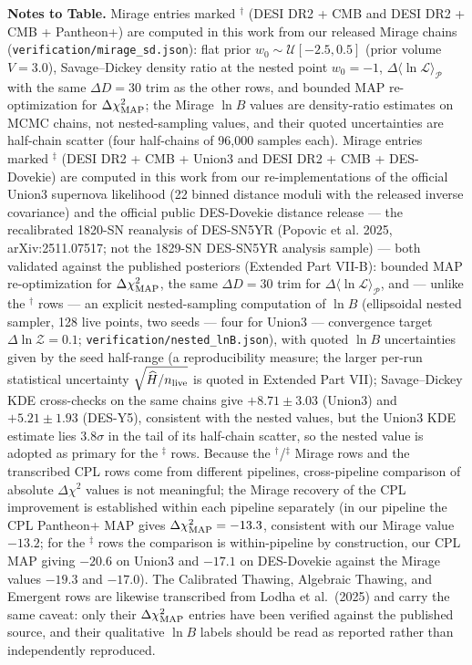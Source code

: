 \documentclass[aps,prd,preprint,superscriptaddress,nofootinbib]{revtex4-2}
\begin{document}
\begin{table}[!htbp]
\par\vspace{4pt}\noindent\textbf{Notes to Table.} Mirage entries marked $^{\dagger}$ (DESI DR2 + CMB and DESI DR2 + CMB + Pantheon+) are computed in this work from our released Mirage chains (\texttt{verification/mirage\_sd.json}): flat prior $w_0 \sim \mathcal{U}[-2.5, 0.5]$ (prior volume $V = 3.0$), Savage--Dickey density ratio at the nested point $w_0 = -1$, $\Delta\langle\ln\mathcal{L}\rangle_{\mathcal{P}}$ with the same $\Delta D = 30$ trim as the other rows, and bounded MAP re-optimization for $\Delta\chi^2_{\rm MAP}$; the Mirage $\ln B$ values are density-ratio estimates on MCMC chains, not nested-sampling values, and their quoted uncertainties are half-chain scatter (four half-chains of 96{,}000 samples each). Mirage entries marked $^{\ddagger}$ (DESI DR2 + CMB + Union3 and DESI DR2 + CMB + DES-Dovekie) are computed in this work from our re-implementations of the official Union3 supernova likelihood (22 binned distance moduli with the released inverse covariance) and the official public DES-Dovekie distance release --- the recalibrated 1820-SN reanalysis of DES-SN5YR (Popovic et al. 2025, arXiv:2511.07517; not the 1829-SN DES-SN5YR analysis sample) --- both validated against the published posteriors (Extended Part VII-B): bounded MAP re-optimization for $\Delta\chi^2_{\rm MAP}$, the same $\Delta D = 30$ trim for $\Delta\langle\ln\mathcal{L}\rangle_{\mathcal{P}}$, and --- unlike the $^{\dagger}$ rows --- an explicit nested-sampling computation of $\ln B$ (ellipsoidal nested sampler, 128 live points, two seeds --- four for Union3 --- convergence target $\Delta\ln\mathcal{Z} = 0.1$; \texttt{verification/nested\_lnB.json}), with quoted $\ln B$ uncertainties given by the seed half-range (a reproducibility measure; the larger per-run statistical uncertainty $\sqrt{\widehat{H}/n_{\rm live}}$ is quoted in Extended Part VII); Savage--Dickey KDE cross-checks on the same chains give $+8.71 \pm 3.03$ (Union3) and $+5.21 \pm 1.93$ (DES-Y5), consistent with the nested values, but the Union3 KDE estimate lies $3.8\sigma$ in the tail of its half-chain scatter, so the nested value is adopted as primary for the $^{\ddagger}$ rows. Because the $^{\dagger}$/$^{\ddagger}$ Mirage rows and the transcribed CPL rows come from different pipelines, cross-pipeline comparison of absolute $\Delta\chi^2$ values is not meaningful; the Mirage recovery of the CPL improvement is established within each pipeline separately (in our pipeline the CPL Pantheon+ MAP gives $\Delta\chi^2_{\rm MAP} = -13.3$, consistent with our Mirage value $-13.2$; for the $^{\ddagger}$ rows the comparison is within-pipeline by construction, our CPL MAP giving $-20.6$ on Union3 and $-17.1$ on DES-Dovekie against the Mirage values $-19.3$ and $-17.0$). The Calibrated Thawing, Algebraic Thawing, and Emergent rows are likewise transcribed from Lodha et al.\ (2025) and carry the same caveat: only their $\Delta\chi^2_{\rm MAP}$ entries have been verified against the published source, and their qualitative $\ln B$ labels should be read as reported rather than independently reproduced.
\end{table}
\end{document}
